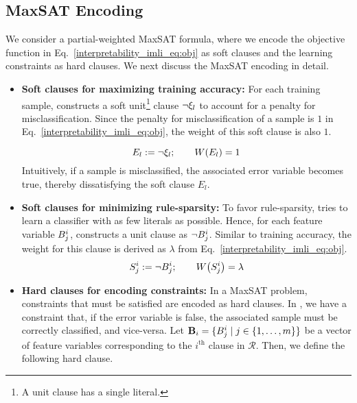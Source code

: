 \subsection{MaxSAT Encoding}
\label{interpretability_imli_sec:encoding}
We consider a partial-weighted MaxSAT formula, where we encode the objective function in Eq.~\eqref{interpretability_imli_eq:obj} as soft clauses and the learning constraints as hard clauses. We next discuss the MaxSAT encoding in detail.

\begin{itemize}
	\item \textbf{Soft clauses for maximizing training accuracy:} For each training sample, {\imli} constructs a soft unit\footnote{A unit clause has a single literal.} clause $ \neg \xi_l $ to account for a penalty for misclassification. Since the penalty for misclassification of a sample is $ 1 $  in Eq.~\eqref{interpretability_imli_eq:obj},  the weight of this soft clause is also $ 1 $. 
	
	\begin{equation}
		\label{interpretability_imli_soft_clause_error}
		E_l:=\neg \xi_l;  \qquad W \! \left( E_l \right)= 1
	\end{equation}
	Intuitively, if a sample is misclassified, the associated error variable becomes true, thereby dissatisfying the soft clause $ E_l $.
	 
	
	\item \textbf{Soft clauses for minimizing rule-sparsity:} To favor rule-sparsity, {\imli} tries to learn a classifier with as few literals as possible. Hence, for each feature variable $ B_j^i $, {\imli} constructs a unit clause as $ \neg B_j^i $. Similar to training accuracy, the weight for this clause is derived as $ \lambda $ from Eq.~\eqref{interpretability_imli_eq:obj}.
	\begin{equation}
		\label{interpretability_imli_soft_clause_feature}
		S_j^i:= \neg B_j^i; \qquad W \! \left( S_j^i \right)= \lambda
	\end{equation}
	

	
	\item \textbf{Hard clauses for encoding constraints:} In a MaxSAT problem, constraints that must be satisfied are encoded as hard clauses. In {\imli}, we have a constraint that, if the error variable is false, the associated sample must be correctly classified, and vice-versa. Let  $\mathbf{B}_i= \{B^i_{j} \mid j \in \{1,\dots,m \}\}$ be a vector of feature variables corresponding to the $ i^\text{th} $  clause in $ \mathcal{R} $. Then, we define the following hard clause.
	

\end{itemize}
